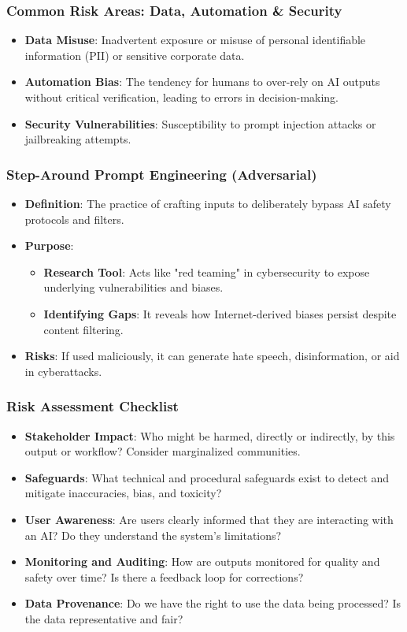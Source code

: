 \documentclass{beamer}
\begin{document}
\begin{frame}
    \frametitle{Common Risk Areas: Data, Automation \& Security}
    \begin{itemize}
        \item \textbf{Data Misuse}: Inadvertent exposure or misuse of personal identifiable information (PII) or sensitive corporate data.
        \item \textbf{Automation Bias}: The tendency for humans to over-rely on AI outputs without critical verification, leading to errors in decision-making.
        \item \textbf{Security Vulnerabilities}: Susceptibility to prompt injection attacks or jailbreaking attempts.
    \end{itemize}
\end{frame}

\begin{frame}
    \frametitle{Step-Around Prompt Engineering (Adversarial)}
    \begin{itemize}
        \item \textbf{Definition}: The practice of crafting inputs to deliberately bypass AI safety protocols and filters.
        \item \textbf{Purpose}:
        \begin{itemize}
            \item \textbf{Research Tool}: Acts like "red teaming" in cybersecurity to expose underlying vulnerabilities and biases.
            \item \textbf{Identifying Gaps}: It reveals how Internet-derived biases persist despite content filtering.
        \end{itemize}
        \item \textbf{Risks}: If used maliciously, it can generate hate speech, disinformation, or aid in cyberattacks.
    \end{itemize}
\end{frame}

\begin{frame}
    \frametitle{Risk Assessment Checklist}
    \begin{itemize}
        \item \textbf{Stakeholder Impact}: Who might be harmed, directly or indirectly, by this output or workflow? Consider marginalized communities.
        \item \textbf{Safeguards}: What technical and procedural safeguards exist to detect and mitigate inaccuracies, bias, and toxicity?
        \item \textbf{User Awareness}: Are users clearly informed that they are interacting with an AI? Do they understand the system's limitations?
        \item \textbf{Monitoring and Auditing}: How are outputs monitored for quality and safety over time? Is there a feedback loop for corrections?
        \item \textbf{Data Provenance}: Do we have the right to use the data being processed? Is the data representative and fair?
    \end{itemize}
\end{frame}
\end{document}
